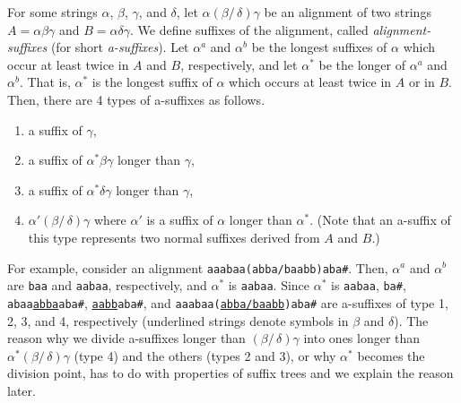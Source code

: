 \documentclass{llncs}
\newcommand{\be}{\begin{enumerate}}
\newcommand{\ee}{\end{enumerate}}
\begin{document}
For some strings $\alpha$, $\beta$, $\gamma$, and $\delta$,
 let $\alpha (\beta /\, \delta)\gamma$ be an alignment of
 two strings $A= \alpha \beta \gamma$ and $B= \alpha \delta \gamma$.
We define suffixes of the alignment, called {\em alignment-suffixes} (for short {\em a-suffixes}).
Let $\alpha^{a}$ and $\alpha^{b}$ be the longest suffixes of $\alpha$
 which occur at least twice in $A$ and $B$, respectively,
 and let $\alpha^{*}$ be the longer of $\alpha^{a}$ and $\alpha^{b}$.
That is, $\alpha^{*}$ is the longest suffix of $\alpha$
 which occurs at least twice in $A$ or in $B$.
Then, there are 4 types of a-suffixes as follows.
\be
\item a suffix of $\gamma$,
\item a suffix of $\alpha^{*} \beta \gamma$ longer than $\gamma$,
\item a suffix of $\alpha^{*} \delta \gamma$ longer than $\gamma$,
\item $\alpha' (\beta /\, \delta) \gamma$
        where $\alpha'$ is a suffix of $\alpha$ longer than $\alpha^{*}$.
       (Note that an a-suffix of this type represents two normal suffixes
        derived from $A$ and $B$.)
\ee
For example, consider an alignment {\tt aaabaa(abba/baabb)aba\#}.
Then, $\alpha^{a}$ and $\alpha^{b}$ are {\tt baa} and {\tt aabaa}, respectively,
 and $\alpha^{*}$ is {\tt aabaa}.
Since $\alpha^{*}$ is {\tt aabaa},
 {\tt ba\#}, {\tt abaa\underline{abba}aba\#}, {\tt \underline{aabb}aba\#},
 and {\tt aaabaa(\underline{abba/baabb})aba\#} are a-suffixes of type 1, 2, 3, and 4, respectively
 (underlined strings denote symbols in $\beta$ and $\delta$).
The reason why we divide a-suffixes longer than $(\beta /\, \delta)\gamma$
 into ones longer than $\alpha^{*}(\beta /\, \delta)\gamma$ (type 4)
 and the others (types 2 and 3),
 or why $\alpha^*$ becomes the division point,
 has to do with properties of suffix trees
 and we explain the reason later.
\end{document}
